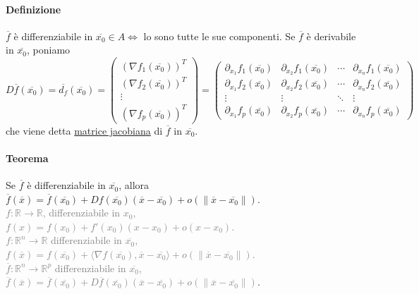 \documentclass{article}
\newcommand{\R}{\mathbb{R}}
\begin{document}
\paragraph{{Definizione}}
$\overline{f}$ è differenziabile in $\overline{x_0}\in A  \Leftrightarrow$ lo sono tutte le sue componenti. Se $\overline{f}$ è derivabile in $\overline{x_0}$, poniamo 
\begin{equation*}
    D\overline{f}(\overline{x_0})=\overline{d_f}(\overline{x_0})=\begin{pmatrix}
    (\nabla f_1(\overline{x_0}))^T\\
    (\nabla f_2(\overline{x_0}))^T\\
    \vdots\\
    (\nabla f_p(\overline{x_0}))^T
\end{pmatrix}=\begin{pmatrix}
    \partial_{x_1}f_1(\overline{x_0})&\partial_{x_2}f_1(\overline{x_0})&\cdots&\partial_{x_n}f_1(\overline{x_0})\\
    \partial_{x_1}f_2(\overline{x_0})&\partial_{x_2}f_2(\overline{x_0})&\cdots&\partial_{x_n}f_2(\overline{x_0})\\
    \vdots&\vdots&\ddots&\vdots \\
    \partial_{x_1}f_p(\overline{x_0})&\partial_{x_2}f_p(\overline{x_0})&\cdots&\partial_{x_n}f_p(\overline{x_0})
\end{pmatrix}
\end{equation*}
che viene detta \underline{matrice jacobiana} di $\overline{f}$ in $\overline{x_0}$.

\paragraph{{Teorema}}
Se $\overline{f}$ è differenziabile in $\overline{x_0}$, allora $\overline{f}(\overline{x})=\overline{f}(\overline{x_0})+Df(\overline{x_0})(\overline{x}-\overline{x_0})+o(\|\overline{x}-\overline{x_0}\|)$.\\
\textcolor{grey}{$f: \R \rightarrow \R$, differenziabile in $x_0$, $f(x)=f(x_0)+f'(x_0)(x-x_0)+o(x-x_0)$.\\
$f:\R^n \rightarrow \R$ differenziabile in $\overline{x_0}$, $f(\overline{x})=f(\overline{x_0})+\langle \nabla f(\overline{x_0}), \overline{x}-\overline{x_0} \rangle + o(\|\overline{x}-\overline{x_0} \|)$.\\
$\overline{f}: \R^n \rightarrow \R^p$ differenziabile in $\overline{x_0}$, $\overline{f}(\overline{x})=\overline{f}(\overline{x_0})+D\overline{f}(\overline{x_0})(\overline{x}-\overline{x_0})+o(\|\overline{x}-\overline{x_0}\|)$}.
\end{document}
